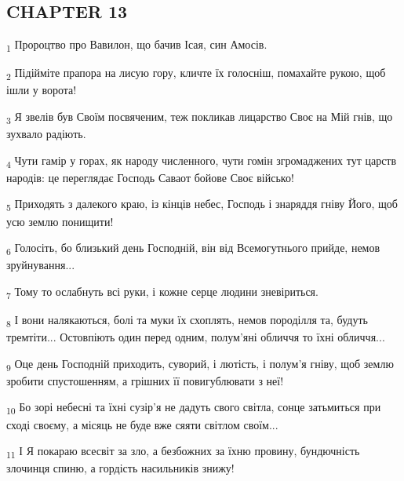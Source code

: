 \subsection{CHAPTER 13}
\begin{tcolorbox}
\textsubscript{1} Пророцтво про Вавилон, що бачив Ісая, син Амосів.
\end{tcolorbox}
\begin{tcolorbox}
\textsubscript{2} Підійміте прапора на лисую гору, кличте їх голосніш, помахайте рукою, щоб ішли у ворота!
\end{tcolorbox}
\begin{tcolorbox}
\textsubscript{3} Я звелів був Своїм посвяченим, теж покликав лицарство Своє на Мій гнів, що зухвало радіють.
\end{tcolorbox}
\begin{tcolorbox}
\textsubscript{4} Чути гамір у горах, як народу численного, чути гомін згромаджених тут царств народів: це переглядає Господь Саваот бойове Своє військо!
\end{tcolorbox}
\begin{tcolorbox}
\textsubscript{5} Приходять з далекого краю, із кінців небес, Господь і знаряддя гніву Його, щоб усю землю понищити!
\end{tcolorbox}
\begin{tcolorbox}
\textsubscript{6} Голосіть, бо близький день Господній, він від Всемогутнього прийде, немов зруйнування...
\end{tcolorbox}
\begin{tcolorbox}
\textsubscript{7} Тому то ослабнуть всі руки, і кожне серце людини зневіриться.
\end{tcolorbox}
\begin{tcolorbox}
\textsubscript{8} І вони налякаються, болі та муки їх схоплять, немов породілля та, будуть тремтіти... Остовпіють один перед одним, полум'яні обличчя то їхні обличчя...
\end{tcolorbox}
\begin{tcolorbox}
\textsubscript{9} Оце день Господній приходить, суворий, і лютість, і полум'я гніву, щоб землю зробити спустошенням, а грішних її повигублювати з неї!
\end{tcolorbox}
\begin{tcolorbox}
\textsubscript{10} Бо зорі небесні та їхні сузір'я не дадуть свого світла, сонце затьмиться при сході своєму, а місяць не буде вже сяяти світлом своїм...
\end{tcolorbox}
\begin{tcolorbox}
\textsubscript{11} І Я покараю всесвіт за зло, а безбожних за їхню провину, бундючність злочинця спиню, а гордість насильників знижу!
\end{tcolorbox}
